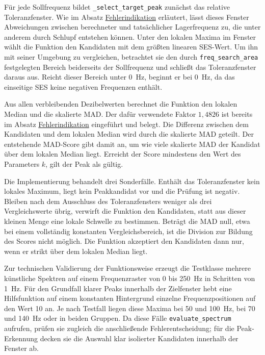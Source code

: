 Für jede Sollfrequenz bildet \texttt{\_select\_target\_peak} zunächst das
relative Toleranzfenster. Wie im Absatz
\hyperref[par:fehlerindikation_pipeline]{Fehlerindikation} erläutert, lässt
dieses Fenster Abweichungen zwischen berechneter und tatsächlicher
Lagerfrequenz zu, die unter anderem durch Schlupf entstehen können. Unter den
lokalen Maxima im Fenster wählt die Funktion den Kandidaten mit dem größten
linearen SES-Wert. Um ihn mit seiner Umgebung zu vergleichen, betrachtet sie
den durch \texttt{freq\_search\_area} festgelegten Bereich beiderseits der
Sollfrequenz und schließt das Toleranzfenster daraus aus. Reicht dieser Bereich
unter 0~Hz, beginnt er bei 0~Hz, da das einseitige \acrshort{SES} keine
negativen Frequenzen enthält.

Aus allen verbleibenden Dezibelwerten berechnet die Funktion den lokalen
Median und die skalierte MAD. Der dafür verwendete Faktor $1{,}4826$ ist
bereits im Absatz
\hyperref[par:fehlerindikation_pipeline]{Fehlerindikation} eingeführt und
belegt. Die Differenz zwischen dem Kandidaten und dem lokalen Median wird durch
die skalierte MAD geteilt. Der entstehende MAD-Score gibt damit an, um wie
viele skalierte MAD der Kandidat über dem lokalen Median liegt. Erreicht der
Score mindestens den Wert des Parameters $k$, gilt der Peak als gültig.

Die Implementierung behandelt drei Sonderfälle. Enthält das Toleranzfenster
kein lokales Maximum, liegt kein Peakkandidat vor und die Prüfung ist negativ.
Bleiben nach dem Ausschluss des Toleranzfensters weniger als drei
Vergleichswerte übrig, verwirft die Funktion den Kandidaten, statt aus dieser
kleinen Menge eine lokale Schwelle zu bestimmen. Beträgt die MAD null, etwa bei
einem vollständig konstanten Vergleichsbereich, ist die Division zur Bildung
des Scores nicht möglich. Die Funktion akzeptiert den Kandidaten dann nur,
wenn er strikt über dem lokalen Median liegt.

Zur technischen Validierung der Funktionsweise erzeugt die Testklasse mehrere
künstliche Spektren auf einem Frequenzraster von 0 bis 250~Hz in Schritten von
1~Hz. Für den Grundfall klarer Peaks innerhalb der Zielfenster hebt eine
Hilfsfunktion auf einem konstanten Hintergrund einzelne Frequenzpositionen auf
den Wert 10 an. Je nach Testfall liegen diese Maxima bei 50 und 100~Hz, bei 70
und 140~Hz oder in beiden Gruppen. Da diese Fälle
\texttt{evaluate\_spectrum} aufrufen, prüfen sie zugleich die anschließende
Fehlerentscheidung; für die Peak-Erkennung decken sie die Auswahl klar
isolierter Kandidaten innerhalb der Fenster ab.

